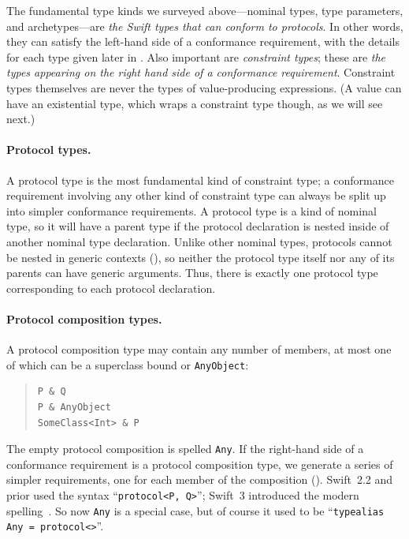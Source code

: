 \documentclass[../generics]{subfiles}
\begin{document}
\medskip

The fundamental type kinds we surveyed above---nominal types, type parameters, and archetypes---are \textsl{the Swift types that can conform to protocols}. In other words, they can satisfy the left-hand side of a conformance requirement, with the details for each type given later in . Also important are \emph{constraint types}; these are \textsl{the types appearing on the right hand side of a conformance requirement}. Constraint types themselves are never the types of value-producing expressions. (A value can have an existential type, which wraps a constraint type though, as we will see next.)

\paragraph{Protocol types.}
A protocol type is the most fundamental kind of constraint type; a conformance requirement involving any other kind of constraint type can always be split up into simpler conformance requirements. A protocol type is a kind of nominal type, so it will have a parent type if the protocol declaration is nested inside of another nominal type declaration. Unlike other nominal types, protocols cannot be nested in generic contexts (), so neither the protocol type itself nor any of its parents can have generic arguments. Thus, there is exactly one protocol type corresponding to each protocol declaration.

\paragraph{Protocol composition types.}
A protocol composition type may contain any number of members, at most one of which can be a superclass bound or \texttt{AnyObject}:
\begin{quote}
\begin{verbatim}
P & Q
P & AnyObject
SomeClass<Int> & P
\end{verbatim}
\end{quote}
The empty protocol composition is spelled \texttt{Any}. If the right-hand side of a conformance requirement is a protocol composition type, we generate a series of simpler requirements, one for each member of the composition (). Swift~2.2 and prior used the syntax ``\verb|protocol<P, Q>|''; Swift~3 introduced the modern spelling~\cite{se0095}. So now \texttt{Any} is a special case, but of course it used to be ``\verb|typealias Any = protocol<>|''.
\end{document}
